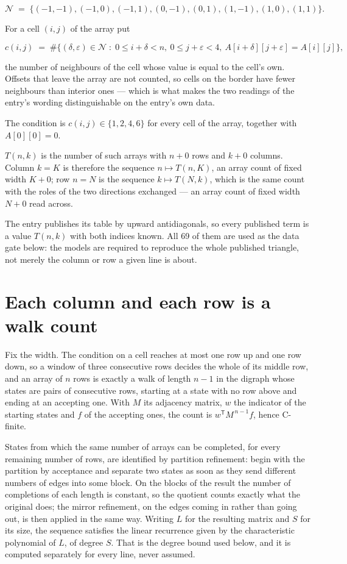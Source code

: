 \documentclass[11pt]{article}
\theoremstyle{definition}
\begin{document}
\[\mathcal{N} \;=\; \{(-1,-1), (-1,0), (-1,1), (0,-1), (0,1), (1,-1), (1,0), (1,1)\}.\]

For a cell $(i,j)$ of the array put

\[c(i,j) \;=\; \#\bigl\{(\delta,\varepsilon)\in\mathcal{N} \;:\; 0\le i+\delta<n,\ 0\le j+\varepsilon<4,\ A[i+\delta][j+\varepsilon] = A[i][j]\bigr\},\]

the number of neighbours of the cell whose value is equal to the cell's own. Offsets that leave the array are not counted, so cells on the border have fewer neighbours than interior ones --- which is what makes the two readings of the entry's wording distinguishable on the entry's own data.

The condition is $c(i,j) \in \{1, 2, 4, 6\}$ for every cell of the array, together with $A[0][0]=0$.

$T(n,k)$ is the number of such arrays with $n + 0$ rows and $k + 0$ columns. Column $k = K$ is therefore the sequence $n \mapsto T(n,K)$, an array count of fixed width $K + 0$; row $n = N$ is the sequence $k \mapsto T(N,k)$, which is the same count with the roles of the two directions exchanged --- an array count of fixed width $N + 0$ read across.

The entry publishes its table by upward antidiagonals, so every published term is a value $T(n,k)$ with both indices known. All 69 of them are used as the data gate below: the models are required to reproduce the whole published triangle, not merely the column or row a given line is about.

\section{Each column and each row is a walk count}

Fix the width. The condition on a cell reaches at most one row up and one row down, so a window of three consecutive rows decides the whole of its middle row, and an array of $n$ rows is exactly a walk of length $n-1$ in the digraph whose states are pairs of consecutive rows, starting at a state with no row above and ending at an accepting one. With $M$ its adjacency matrix, $w$ the indicator of the starting states and $f$ of the accepting ones, the count is $w^{\mathsf T}M^{\,n-1}f$, hence C-finite.

States from which the same number of arrays can be completed, for every remaining number of rows, are identified by partition refinement: begin with the partition by acceptance and separate two states as soon as they send different numbers of edges into some block. On the blocks of the result the number of completions of each length is constant, so the quotient counts exactly what the original does; the mirror refinement, on the edges coming in rather than going out, is then applied in the same way. Writing $L$ for the resulting matrix and $S$ for its size, the sequence satisfies the linear recurrence given by the characteristic polynomial of $L$, of degree $S$. That is the degree bound used below, and it is computed separately for every line, never assumed.
\end{document}
